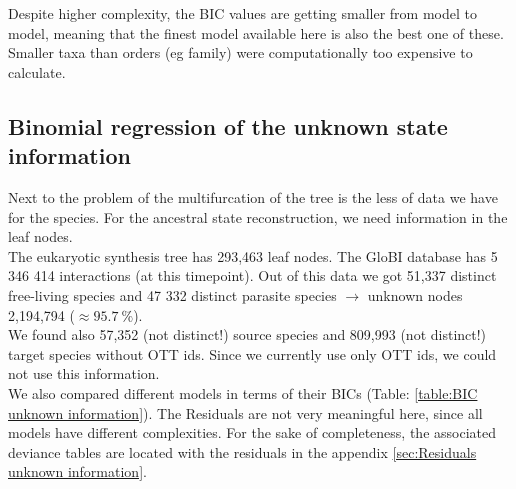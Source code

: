       Despite higher complexity, the BIC values are getting smaller from model to model, meaning that 
        the finest model available here is also the best one of these. Smaller taxa than orders (eg 
        family) were computationally too expensive to calculate.

    \subsection{Binomial regression of the unknown state information}

      Next to the problem of the multifurcation of the tree is the less of data we have for the species.
        For the ancestral state reconstruction, we need information in the leaf nodes. \\
      The eukaryotic synthesis tree has 293,463 leaf nodes. The GloBI database has 5 346 414 interactions 
        (at this timepoint). Out of this data we got 51,337 distinct free-living species and 47 332 
        distinct parasite species $\rightarrow$ unknown nodes 2,194,794 ($\approx 95.7~\%$). \\
      We found also 57,352 (not distinct!) source species and 809,993 (not distinct!) target
        species without OTT ids. Since we currently use only OTT ids, we could not use this information. \\

      We also compared different models in terms of their BICs (Table: \ref{table:BIC unknown information}). 
        The Residuals are not very meaningful here, since all models have different complexities. %
        For the sake of completeness, the associated deviance tables are located with the residuals in 
        the appendix \ref{sec:Residuals unknown information}.

